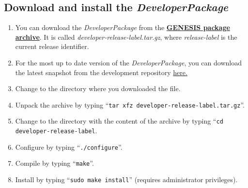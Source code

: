 \documentclass[12pt]{article}
\begin{document}
\subsection*{Download and install the {\it DeveloperPackage}}

\begin{enumerate}
   \item You can download the {\it DeveloperPackage} from the \href{http://repo-genesis3.cbi.utsa.edu/src/}{\bf GENESIS package archive}. It is called {\it developer-release-label.tar.gz}, where {\it release-label} is the current release identifier.
   \item For the most up to date version of the {\it DeveloperPackage}, you can download the latest snapshot from the development repository \href{http://repo-genesis3.cbi.utsa.edu/src/}{here.}
   \item Change to the directory where you downloaded the file.
   \item Unpack the archive by typing ``{\tt tar xfz developer-release-label.tar.gz}''.
   \item Change to the directory with the content of the archive by typing ``{\tt cd developer-release-label}.
   \item Configure by typing ``{\tt ./configure}''.
   \item Compile by typing ``{\tt make}''.
   \item Install by typing ``{\tt sudo make install}''  (requires administrator privileges). 
\end{enumerate}



\end{document}
